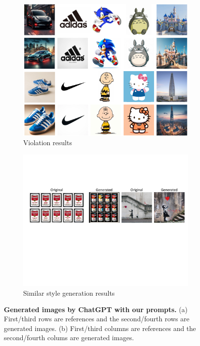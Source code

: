 
\begin{figure}
    \centering
    \begin{subfigure}[t]{\textwidth}
        \centering
        \includegraphics[width=0.99\textwidth]{figure_folder/success_all.pdf}
        \vspace{-0.1in}
        \caption{\small Violation results}
        \label{figa:violate}
    \end{subfigure}
    \begin{subfigure}[t]{\textwidth}
        \centering
        \includegraphics[width=0.99\textwidth]{figure_folder/generated_results_single_row.pdf}
        \vspace{-0.1in}
        \caption{\small Similar style generation results}
        \label{figb:similar}
    \end{subfigure}
    \vspace{-0.13in}
    \caption{\small \textbf{Generated images by ChatGPT with our prompts.} (a) First/third rows are references and the second/fourth rows are generated images. (b) First/third columns are references and the second/fourth colums are generated images.}
    \vspace{-0.23in}
    \label{fig3:our_attack}
\end{figure}
